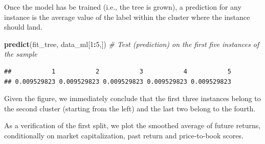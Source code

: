 \documentclass[]{krantz}
\makeatletter
\newenvironment{Shaded}{\begin{snugshade}}{\end{snugshade}}
\newcommand{\CommentTok}[1]{\textcolor[rgb]{0.37,0.37,0.37}{\textit{#1}}}
\newcommand{\DataTypeTok}[1]{\textcolor[rgb]{0.27,0.27,0.27}{#1}}
\newcommand{\DecValTok}[1]{\textcolor[rgb]{0.06,0.06,0.06}{#1}}
\newcommand{\KeywordTok}[1]{\textcolor[rgb]{0.27,0.27,0.27}{\textbf{#1}}}
\newcommand{\NormalTok}[1]{#1}
\newcommand{\OperatorTok}[1]{\textcolor[rgb]{0.43,0.43,0.43}{\textbf{#1}}}
\newcommand{\OtherTok}[1]{\textcolor[rgb]{0.37,0.37,0.37}{#1}}
\newcommand{\StringTok}[1]{\textcolor[rgb]{0.5,0.5,0.5}{#1}}
\newenvironment{kframe}{%
\medskip{}
\setlength{\fboxsep}{.8em}
 \def\at@end@of@kframe{}%
 \ifinner\ifhmode%
  \def\at@end@of@kframe{\end{minipage}}%
  \begin{minipage}{\columnwidth}%
 \fi\fi%
 \def\FrameCommand##1{\hskip\@totalleftmargin \hskip-\fboxsep
 \colorbox{shadecolor}{##1}\hskip-\fboxsep
     \hskip-\linewidth \hskip-\@totalleftmargin \hskip\columnwidth}%
 \MakeFramed {\advance\hsize-\width
   \@totalleftmargin\z@ \linewidth\hsize
   \@setminipage}}%
 {\par\unskip\endMakeFramed%
 \at@end@of@kframe}
\renewenvironment{Shaded}{\begin{kframe}}{\end{kframe}}
\theoremstyle{definition}
\theoremstyle{definition}
\theoremstyle{definition}
\theoremstyle{remark}
\makeatother
\begin{document}
Once the model has be trained (i.e., the tree is grown), a prediction
for any instance is the average value of the label within the cluster
where the instance should land.

\footnotesize

\begin{Shaded}
\begin{Highlighting}[]
\KeywordTok{predict}\NormalTok{(fit_tree, data_ml[}\DecValTok{1}\OperatorTok{:}\DecValTok{5}\NormalTok{,]) }\CommentTok{# Test (prediction) on the first five instances of the sample}
\end{Highlighting}
\end{Shaded}

\begin{verbatim}
##           1           2           3           4           5 
## 0.009529823 0.009529823 0.009529823 0.009529823 0.009529823
\end{verbatim}

\normalsize

Given the figure, we immediately conclude that the first three instances
belong to the second cluster (starting from the left) and the last two
belong to the fourth.

As a verification of the first split, we plot the smoothed average of
future returns, conditionally on market capitalization, past return and
price-to-book scores.

\footnotesize

\begin{Shaded}
\end{Shaded}
\end{document}

